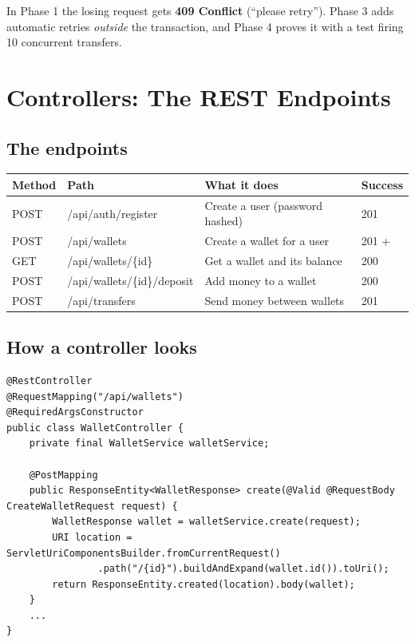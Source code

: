 \documentclass[11pt,a4paper]{article}
\newcommand{\code}[1]{\texttt{\detokenize{#1}}}
\begin{document}
In Phase 1 the losing request gets \textbf{409 Conflict} (``please retry''). Phase 3 adds automatic retries
\emph{outside} the transaction, and Phase 4 proves it with a test firing 10 concurrent transfers.

\section{Controllers: The REST Endpoints}

\subsection{The endpoints}
\begin{center}
\begin{tabularx}{\textwidth}{l >{\ttfamily}l X l}
\toprule
Method & \normalfont\bfseries Path & What it does & Success \\
\midrule
POST & /api/auth/register & Create a user (password hashed) & 201 \\
POST & /api/wallets & Create a wallet for a user & 201 + \code{Location} \\
GET  & /api/wallets/\{id\} & Get a wallet and its balance & 200 \\
POST & /api/wallets/\{id\}/deposit & Add money to a wallet & 200 \\
POST & /api/transfers & Send money between wallets & 201 \\
\bottomrule
\end{tabularx}
\end{center}

\subsection{How a controller looks}
\begin{lstlisting}
@RestController
@RequestMapping("/api/wallets")
@RequiredArgsConstructor
public class WalletController {
    private final WalletService walletService;

    @PostMapping
    public ResponseEntity<WalletResponse> create(@Valid @RequestBody CreateWalletRequest request) {
        WalletResponse wallet = walletService.create(request);
        URI location = ServletUriComponentsBuilder.fromCurrentRequest()
                .path("/{id}").buildAndExpand(wallet.id()).toUri();
        return ResponseEntity.created(location).body(wallet);
    }
    ...
}
\end{lstlisting}
\end{document}
